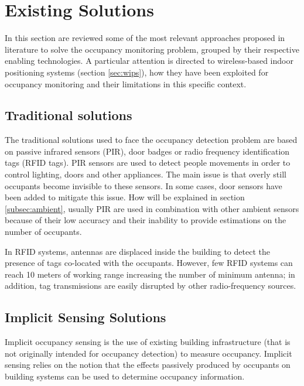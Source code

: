 \section{Existing Solutions}
\label{sec:soa}
In this section are reviewed some of the most relevant approaches proposed in literature to solve the occupancy monitoring problem, grouped by their respective enabling technologies. A particular attention is directed to wireless-based indoor positioning systems (section \ref{sec:wips}), how they have been exploited for occupancy monitoring and their limitations in this specific context.

\subsection{Traditional solutions}
The traditional solutions used to face the occupancy detection problem are based on passive infrared sensors (PIR), door badges or radio frequency identification tags (RFID tags). PIR sensors are used to detect people movements in order to control lighting, doors and other appliances.
The main issue is that overly still occupants become invisible to these sensors. In some cases, door sensors have been added to mitigate this issue. How will be explained in section \ref{subsec:ambient}, usually PIR are used in combination with other ambient sensors because of their low accuracy and their inability to provide estimations on the number of occupants.

In RFID systems, antennas are displaced inside the building to detect the presence of tags co-located with the occupants. However, few RFID systems can reach 10 meters of working range increasing the number of minimum antenna; in addition, tag transmissions are easily disrupted by other radio-frequency sources.


\subsection{Implicit Sensing Solutions}
\label{subsec:implicit}
Implicit occupancy sensing is the use of existing building infrastructure (that is not originally intended for occupancy detection) to measure occupancy. Implicit sensing relies on the notion that the effects passively produced by occupants on building systems can be used to determine occupancy information.

